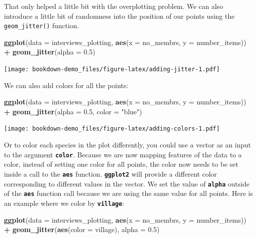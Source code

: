 \documentclass[]{book}
\newenvironment{Shaded}{\begin{snugshade}}{\end{snugshade}}
\newcommand{\KeywordTok}[1]{\textcolor[rgb]{0.13,0.29,0.53}{\textbf{#1}}}
\newcommand{\DataTypeTok}[1]{\textcolor[rgb]{0.13,0.29,0.53}{#1}}
\newcommand{\FloatTok}[1]{\textcolor[rgb]{0.00,0.00,0.81}{#1}}
\newcommand{\StringTok}[1]{\textcolor[rgb]{0.31,0.60,0.02}{#1}}
\newcommand{\OperatorTok}[1]{\textcolor[rgb]{0.81,0.36,0.00}{\textbf{#1}}}
\newcommand{\NormalTok}[1]{#1}
\begin{document}
That only helped a little bit with the overplotting problem. We can also
introduce a little bit of randomness into the position of our points
using the \texttt{geom\_jitter()} function.

\begin{Shaded}
\begin{Highlighting}[]
\KeywordTok{ggplot}\NormalTok{(}\DataTypeTok{data =}\NormalTok{ interviews_plotting, }\KeywordTok{aes}\NormalTok{(}\DataTypeTok{x =}\NormalTok{ no_membrs, }\DataTypeTok{y =}\NormalTok{ number_items)) }\OperatorTok{+}
\StringTok{    }\KeywordTok{geom_jitter}\NormalTok{(}\DataTypeTok{alpha =} \FloatTok{0.5}\NormalTok{)}
\end{Highlighting}
\end{Shaded}

\texttt{[image: bookdown-demo\_files/figure-latex/adding-jitter-1.pdf]}

We can also add colors for all the points:

\begin{Shaded}
\begin{Highlighting}[]
\KeywordTok{ggplot}\NormalTok{(}\DataTypeTok{data =}\NormalTok{ interviews_plotting, }\KeywordTok{aes}\NormalTok{(}\DataTypeTok{x =}\NormalTok{ no_membrs, }\DataTypeTok{y =}\NormalTok{ number_items)) }\OperatorTok{+}
\StringTok{    }\KeywordTok{geom_jitter}\NormalTok{(}\DataTypeTok{alpha =} \FloatTok{0.5}\NormalTok{, }\DataTypeTok{color =} \StringTok{"blue"}\NormalTok{)}
\end{Highlighting}
\end{Shaded}

\texttt{[image: bookdown-demo\_files/figure-latex/adding-colors-1.pdf]}

Or to color each species in the plot differently, you could use a vector
as an input to the argument \textbf{\texttt{color}}. Because we are now
mapping features of the data to a color, instead of setting one color
for all points, the color now needs to be set inside a call to the
\textbf{\texttt{aes}} function. \textbf{\texttt{ggplot2}} will provide a
different color corresponding to different values in the vector. We set
the value of \textbf{\texttt{alpha}} outside of the
\textbf{\texttt{aes}} function call because we are using the same value
for all points. Here is an example where we color by
\textbf{\texttt{village}}:

\begin{Shaded}
\begin{Highlighting}[]
\KeywordTok{ggplot}\NormalTok{(}\DataTypeTok{data =}\NormalTok{ interviews_plotting, }\KeywordTok{aes}\NormalTok{(}\DataTypeTok{x =}\NormalTok{ no_membrs, }\DataTypeTok{y =}\NormalTok{ number_items)) }\OperatorTok{+}
\StringTok{    }\KeywordTok{geom_jitter}\NormalTok{(}\KeywordTok{aes}\NormalTok{(}\DataTypeTok{color =}\NormalTok{ village), }\DataTypeTok{alpha =} \FloatTok{0.5}\NormalTok{)}
\end{Highlighting}
\end{Shaded}
\end{document}
